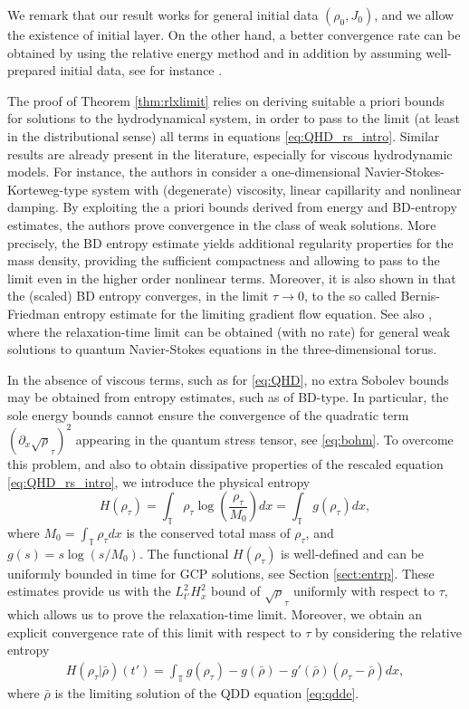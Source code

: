 \documentclass[leqno]{amsart}
\theoremstyle{plain}
\theoremstyle{definition}
\theoremstyle{remark}
\theoremstyle{plain}
\theoremstyle{plain}
\def\T{{\mathbb T}}%
\def\d{{\partial}}
\numberwithin{equation}{section}
\begin{document}
We remark that our result works for general initial data $(\rho_0,J_0)$, and we allow the existence of initial layer. On the other hand, a better convergence rate can be obtained by using the relative energy method and in addition by assuming well-prepared initial data, see for instance \cite{LT}.

The proof of Theorem \ref{thm:rlxlimit} relies on deriving suitable a priori bounds for solutions to the hydrodynamical system, in order to pass to the limit (at least in the distributional sense) all terms in equations \eqref{eq:QHD_rs_intro}. Similar results are already present in the literature, especially for viscous hydrodynamic models. For instance, the authors in \cite{Blub} consider a one-dimensional Navier-Stokes-Korteweg-type system with (degenerate) viscosity, linear capillarity and nonlinear damping. By exploiting the a priori bounds derived from energy and BD-entropy estimates, the authors prove convergence in the class of weak solutions. More precisely, the BD entropy estimate yields additional regularity properties for the mass density, providing the sufficient compactness and allowing to pass to the limit even in the higher order nonlinear terms. Moreover, it is also shown in \cite{Blub} that the (scaled) BD entropy converges, in the limit $\tau\to0$, to the so called Bernis-Friedman entropy estimate for the limiting gradient flow equation. See also \cite{ACLS}, where the relaxation-time limit can be obtained (with no rate) for general weak solutions to quantum Navier-Stokes equations in the three-dimensional torus.

In the absence of viscous terms, such as for \eqref{eq:QHD}, no extra Sobolev bounds may be obtained from entropy estimates, such as of BD-type. 
In particular, the sole energy bounds cannot ensure the convergence of the quadratic term $(\d_x\sqrt\rho_\tau)^2$ appearing in the quantum stress tensor, see \eqref{eq:bohm}. To overcome this problem, and also to obtain dissipative properties of the rescaled equation \eqref{eq:QHD_rs_intro}, we introduce the physical entropy
\[
H(\rho_\tau)=\int_\T\rho_\tau\log\left(\frac{\rho_\tau}{M_0}\right)dx=\int_\T g(\rho_\tau)dx,
\]
where $M_0=\int_\T\rho_\tau dx$ is the conserved total mass of $\rho_\tau$, and $g(s)=s\log(s/M_0)$. 
The functional $H(\rho_\tau)$ is well-defined and can be uniformly bounded in time for GCP solutions, see Section \ref{sect:entrp}.
These estimates provide us with the $L^2_{t'}H^2_x$ bound of $\sqrt\rho_\tau$ uniformly with respect to $\tau$, which allows us to prove the relaxation-time limit. Moreover, we obtain an explicit convergence rate of this limit with respect to  $\tau$ by considering the relative entropy 
\begin{align*}
H(\rho_\tau|\bar\rho)(t')=\int_\T g(\rho_\tau)-g(\bar\rho)-g'(\bar\rho)(\rho_\tau-\bar\rho)dx,
\end{align*}
where $\bar\rho$ is the limiting solution of the QDD equation \eqref{eq:qdde}.
\end{document}
